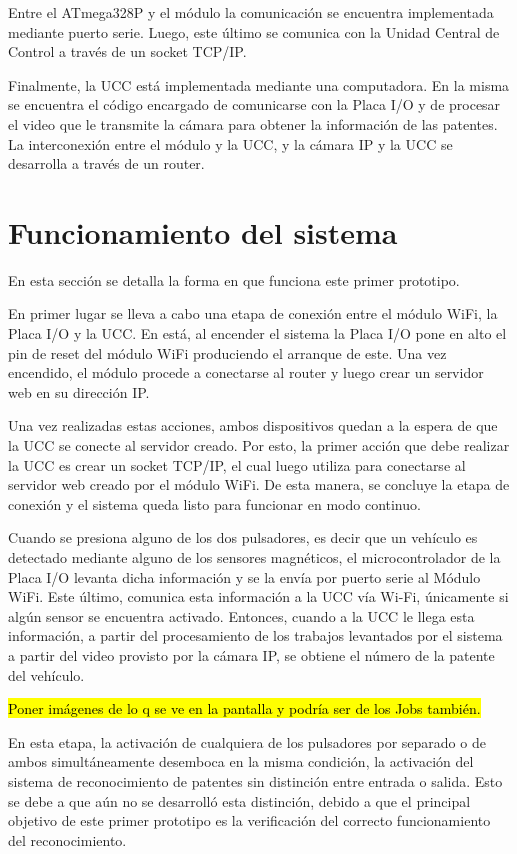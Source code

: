 Entre el ATmega328P y el módulo la comunicación se encuentra implementada mediante puerto serie. Luego, este último se comunica con la Unidad Central de Control a través de un socket TCP/IP.

Finalmente, la UCC está implementada mediante una computadora. En la misma se encuentra el código encargado de comunicarse con la Placa I/O y de procesar el video que le transmite la cámara para obtener la información de las patentes. La interconexión entre el módulo y la UCC, y la cámara IP y la UCC se desarrolla a través de un router. 

\section{Funcionamiento del sistema}\label{sec:funcSist}

En esta sección se detalla la forma en que funciona este primer prototipo. 

\textcolor{mPurple}{En primer lugar se lleva a cabo una etapa de conexión entre el módulo WiFi, la Placa I/O y la UCC. En está, al encender el sistema la Placa I/O pone en alto el pin de reset del módulo WiFi produciendo el arranque de este. Una vez encendido, el módulo procede a conectarse al router y luego crear un servidor web en su dirección IP.}

\textcolor{mPurple}{Una vez realizadas estas acciones, ambos dispositivos quedan a la espera de que la UCC se conecte al servidor creado. Por esto, la primer acción que debe realizar la UCC es crear un socket TCP/IP,  el cual luego utiliza para conectarse al servidor web creado por el módulo WiFi. De esta manera, se concluye la etapa de conexión y el sistema queda listo para funcionar en modo continuo.}

Cuando se presiona alguno de los dos pulsadores, es decir que un vehículo es detectado mediante alguno de los sensores magnéticos, el microcontrolador de la Placa I/O levanta dicha información y se la envía por puerto serie al Módulo WiFi. Este último, comunica esta información a la UCC vía Wi-Fi, únicamente si algún sensor se encuentra activado. Entonces, cuando a la UCC le llega esta información, a partir del procesamiento de los trabajos levantados por el sistema a partir del video provisto por la cámara IP, se obtiene el número de la patente del vehículo. 

\hl{Poner im\'agenes de lo q se ve en la pantalla y podr\'ia ser de los Jobs tambi\'en.}

En esta etapa, la activación de cualquiera de los pulsadores por separado o de ambos simultáneamente desemboca en la misma condición, la activación del sistema de reconocimiento de patentes sin distinción entre entrada o salida. Esto se debe a que aún no se desarrolló esta distinción, debido a que el principal objetivo de este primer prototipo es la verificación del correcto funcionamiento del reconocimiento.

